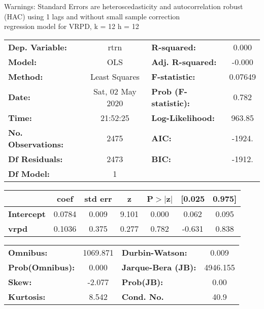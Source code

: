 Warnings: \newline
 [1] Standard Errors are heteroscedasticity and autocorrelation robust (HAC) using 1 lags and without small sample correction\\ 

regression model for VRPD, k = 12 h = 12\begin{center}
\begin{tabular}{lclc}
\toprule
\textbf{Dep. Variable:}    &       rtrn       & \textbf{  R-squared:         } &     0.000   \\
\textbf{Model:}            &       OLS        & \textbf{  Adj. R-squared:    } &    -0.000   \\
\textbf{Method:}           &  Least Squares   & \textbf{  F-statistic:       } &   0.07649   \\
\textbf{Date:}             & Sat, 02 May 2020 & \textbf{  Prob (F-statistic):} &    0.782    \\
\textbf{Time:}             &     21:52:25     & \textbf{  Log-Likelihood:    } &    963.85   \\
\textbf{No. Observations:} &        2475      & \textbf{  AIC:               } &    -1924.   \\
\textbf{Df Residuals:}     &        2473      & \textbf{  BIC:               } &    -1912.   \\
\textbf{Df Model:}         &           1      & \textbf{                     } &             \\
\bottomrule
\end{tabular}
\begin{tabular}{lcccccc}
                   & \textbf{coef} & \textbf{std err} & \textbf{z} & \textbf{P$> |$z$|$} & \textbf{[0.025} & \textbf{0.975]}  \\
\midrule
\textbf{Intercept} &       0.0784  &        0.009     &     9.101  &         0.000        &        0.062    &        0.095     \\
\textbf{vrpd}      &       0.1036  &        0.375     &     0.277  &         0.782        &       -0.631    &        0.838     \\
\bottomrule
\end{tabular}
\begin{tabular}{lclc}
\textbf{Omnibus:}       & 1069.871 & \textbf{  Durbin-Watson:     } &    0.009  \\
\textbf{Prob(Omnibus):} &   0.000  & \textbf{  Jarque-Bera (JB):  } & 4946.155  \\
\textbf{Skew:}          &  -2.077  & \textbf{  Prob(JB):          } &     0.00  \\
\textbf{Kurtosis:}      &   8.542  & \textbf{  Cond. No.          } &     40.9  \\
\bottomrule
\end{tabular}
\end{center}

